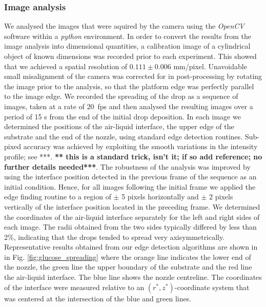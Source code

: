 \documentclass[aip,graphicx]{revtex4-1}
\begin{document}
\subsubsection{Image analysis\label{image}}
We analysed the images that were aquired by the camera using the \textit{OpenCV}
software\cite{bradski2008learning} within a \textit{python} environment.  In
order to convert the results from the image analysis into dimensional
quantities, a calibration image of a cylindrical object of known
dimensions was recorded prior to each experiment. This showed
that we achieved a spatial resolution of $0.111 \pm 0.006$
mm/pixel. Unavoidable small misalignment of the camera was corrected for in
post-processing by rotating the image prior to the analysis, so that
the platform edge was perfectly parallel to the image edge.
We recorded the spreading of the drop as a sequence of images, taken at a
rate of 20~fps and then analysed the resulting images over a period of 
15 s from the end of the initial drop deposition. In each image we determined 
the positions of the air-liquid interface, the upper edge of the
substrate and the end of the nozzle, using standard edge detection routines.
Sub-pixed accuracy was achieved by exploiting the smooth variations 
in the intensity profile; see ***. {\bf *** this is a standard trick, isn't it; 
if so add reference; no further details needed***}. The robustness of
the analysis was improved by using the interface position detected in the
previous frame of the sequence as an initial condition. Hence, for all
images following the initial frame we applied the edge finding routine
to a region of $\pm$ 5 pixels horizontally and $\pm$ 2 pixels
vertically of the interface position located in the preceding
frame. We determined the coordinates of the air-liquid interface separately
for the left and right sides of each image. The radii obtained from
the two sides typically differed by less than 2\%, indicating that
the drops tended to spread very axisymmetrically. Representative
results obtained from our edge detection algorithms are shown in in Fig. 
\ref{fig:glucose_spreading} where the orange line indicates the lower
end of the nozzle, the green line the upper boundary of the 
substrate and the red line the air-liquid interface. The blue line
shows the nozzle centreline. The coordinates of the interface were 
measured relative to an $(r^*,z^*)$-coordinate system that was centered at
the intersection of the blue and green lines.


\end{document}
